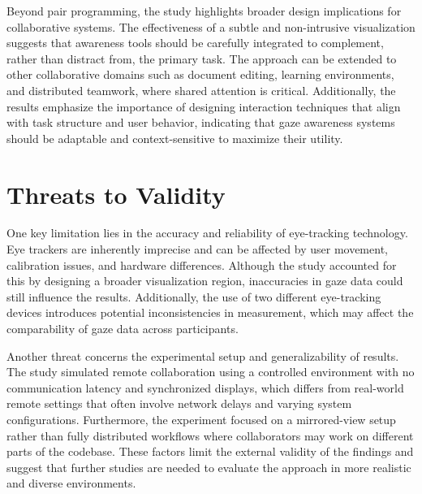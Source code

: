 Beyond pair programming, the study highlights broader design implications for collaborative systems. The effectiveness of a subtle and non-intrusive visualization suggests that awareness tools should be carefully integrated to complement, rather than distract from, the primary task. The approach can be extended to other collaborative domains such as document editing, learning environments, and distributed teamwork, where shared attention is critical. Additionally, the results emphasize the importance of designing interaction techniques that align with task structure and user behavior, indicating that gaze awareness systems should be adaptable and context-sensitive to maximize their utility.

\section{Threats to Validity}
One key limitation lies in the accuracy and reliability of eye-tracking technology. Eye trackers are inherently imprecise and can be affected by user movement, calibration issues, and hardware differences. Although the study accounted for this by designing a broader visualization region, inaccuracies in gaze data could still influence the results. Additionally, the use of two different eye-tracking devices introduces potential inconsistencies in measurement, which may affect the comparability of gaze data across participants.

Another threat concerns the experimental setup and generalizability of results. The study simulated remote collaboration using a controlled environment with no communication latency and synchronized displays, which differs from real-world remote settings that often involve network delays and varying system configurations. Furthermore, the experiment focused on a mirrored-view setup rather than fully distributed workflows where collaborators may work on different parts of the codebase. These factors limit the external validity of the findings and suggest that further studies are needed to evaluate the approach in more realistic and diverse environments.